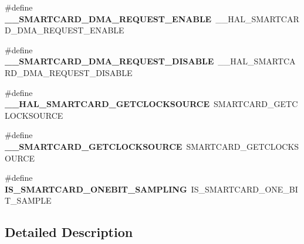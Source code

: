 \begin{DoxyCompactItemize}
\item 
\hypertarget{group___h_a_l___s_m_a_r_t_c_a_r_d___aliased___macros_ga758ec49e911579f65f7cb03e11cbf1b7}{\#define {\bfseries \-\_\-\-\_\-\-S\-M\-A\-R\-T\-C\-A\-R\-D\-\_\-\-D\-M\-A\-\_\-\-R\-E\-Q\-U\-E\-S\-T\-\_\-\-E\-N\-A\-B\-L\-E}~\-\_\-\-\_\-\-H\-A\-L\-\_\-\-S\-M\-A\-R\-T\-C\-A\-R\-D\-\_\-\-D\-M\-A\-\_\-\-R\-E\-Q\-U\-E\-S\-T\-\_\-\-E\-N\-A\-B\-L\-E}\label{group___h_a_l___s_m_a_r_t_c_a_r_d___aliased___macros_ga758ec49e911579f65f7cb03e11cbf1b7}

\item 
\hypertarget{group___h_a_l___s_m_a_r_t_c_a_r_d___aliased___macros_gac7fcc6baa98b300ea02656c79c48b2a9}{\#define {\bfseries \-\_\-\-\_\-\-S\-M\-A\-R\-T\-C\-A\-R\-D\-\_\-\-D\-M\-A\-\_\-\-R\-E\-Q\-U\-E\-S\-T\-\_\-\-D\-I\-S\-A\-B\-L\-E}~\-\_\-\-\_\-\-H\-A\-L\-\_\-\-S\-M\-A\-R\-T\-C\-A\-R\-D\-\_\-\-D\-M\-A\-\_\-\-R\-E\-Q\-U\-E\-S\-T\-\_\-\-D\-I\-S\-A\-B\-L\-E}\label{group___h_a_l___s_m_a_r_t_c_a_r_d___aliased___macros_gac7fcc6baa98b300ea02656c79c48b2a9}

\item 
\hypertarget{group___h_a_l___s_m_a_r_t_c_a_r_d___aliased___macros_ga94815bec2412334dadbc50408ff955f2}{\#define {\bfseries \-\_\-\-\_\-\-H\-A\-L\-\_\-\-S\-M\-A\-R\-T\-C\-A\-R\-D\-\_\-\-G\-E\-T\-C\-L\-O\-C\-K\-S\-O\-U\-R\-C\-E}~S\-M\-A\-R\-T\-C\-A\-R\-D\-\_\-\-G\-E\-T\-C\-L\-O\-C\-K\-S\-O\-U\-R\-C\-E}\label{group___h_a_l___s_m_a_r_t_c_a_r_d___aliased___macros_ga94815bec2412334dadbc50408ff955f2}

\item 
\hypertarget{group___h_a_l___s_m_a_r_t_c_a_r_d___aliased___macros_gaba3d4f1525efcda959a2a468889af9d6}{\#define {\bfseries \-\_\-\-\_\-\-S\-M\-A\-R\-T\-C\-A\-R\-D\-\_\-\-G\-E\-T\-C\-L\-O\-C\-K\-S\-O\-U\-R\-C\-E}~S\-M\-A\-R\-T\-C\-A\-R\-D\-\_\-\-G\-E\-T\-C\-L\-O\-C\-K\-S\-O\-U\-R\-C\-E}\label{group___h_a_l___s_m_a_r_t_c_a_r_d___aliased___macros_gaba3d4f1525efcda959a2a468889af9d6}

\item 
\hypertarget{group___h_a_l___s_m_a_r_t_c_a_r_d___aliased___macros_ga02c2a746784a8186a7a1fbbe452670d3}{\#define {\bfseries I\-S\-\_\-\-S\-M\-A\-R\-T\-C\-A\-R\-D\-\_\-\-O\-N\-E\-B\-I\-T\-\_\-\-S\-A\-M\-P\-L\-I\-N\-G}~I\-S\-\_\-\-S\-M\-A\-R\-T\-C\-A\-R\-D\-\_\-\-O\-N\-E\-\_\-\-B\-I\-T\-\_\-\-S\-A\-M\-P\-L\-E}\label{group___h_a_l___s_m_a_r_t_c_a_r_d___aliased___macros_ga02c2a746784a8186a7a1fbbe452670d3}

\end{DoxyCompactItemize}


\subsection{Detailed Description}
